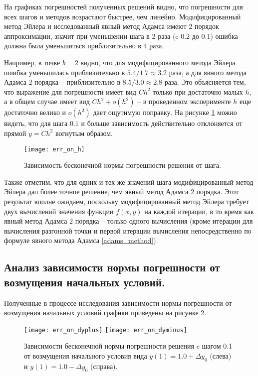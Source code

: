 \documentclass[a4paper, 12pt]{article}
\theoremstyle{mythm}
\begin{document}
	На графиках погрешностей полученных решений видно, что погрешности для всех шагов и методов возрастают быстрее, чем линейно. Модифицированный метод Эйлера и исследованный явный метод Адамса имеют 2 порядок аппроксимации, значит при уменьшении шага в 2 раза (c $0.2$ до $0.1$) ошибка должна была уменьшиться приблизительно в 4 раза. 
	
	Например, в точке $b=2$ видно, что для модифицированного метода Эйлера ошибка уменьшилась приблизительно в $5.4/1.7\approx3.2$ раза, а для явного метода Адамса 2 порядка -- приблизительно в $8.5/3.0\approx2.8$ раза. Это объясняется тем, что выражение для погрешности имеет вид $Ch^2$ только при достаточно малых $h$, а в общем случае имеет вид $Ch^2 + o(h^2)$ -- в проведенном эксперименте $h$ еще достаточно велико и $o(h^2)$ дает ощутимую поправку. На рисунке \ref{fig:err_on_h} можно видеть, что для шага $0.1$ и больше зависимость действительно отклоняется от прямой $y=Ch^2$ вогнутым образом.
	
	\begin{figure}[H]\centering
		\texttt{[image: err\_on\_h]}
		\caption{Зависимость бесконечной нормы погрешности решения от шага.}\label{fig:err_on_h}
	\end{figure}
	
	Также отметим, что для одних и тех же значений шага модифицированный метод Эйлера дал более точное решение, чем явный метод Адамса 2 порядка. Этот результат вполне ожидаем, поскольку модифицированный метод Эйлера требует двух вычислений значения функции $f(x,y)$ на каждой итерации, в то время как явный метод Адамса 2 порядка -- только одного вычисления (кроме итерации для вычисления разгонной точки и первой итерации вычисления непосредственно по формуле явного метода Адамса \eqref{adams_method}).
	
	\subsection{Анализ зависимости нормы погрешности от возмущения начальных условий.}
	
	Полученные в процессе исследования зависимости нормы погрешности от возмущения начальных условий графики приведены на рисунке \ref{fig:err_on_dy}.
	
	\begin{figure}[H]\centering
		\texttt{[image: err\_on\_dyplus]}
		\texttt{[image: err\_on\_dyminus]}
		\caption{Зависимости бесконечной нормы погрешности решения c шагом 0.1 от возмущения начального условия вида $y(1) = 1.0+\Delta y_0$ (слева) и $y(1) = 1.0-\Delta y_0$ (справа).}\label{fig:err_on_dy}
	\end{figure}
\end{document}
